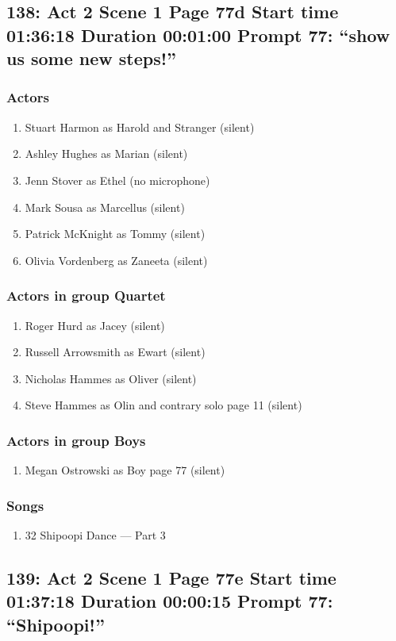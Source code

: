 \subsection{138: Act 2 Scene 1 Page 77d Start time 01:36:18 Duration 00:01:00 Prompt 77: ``show us some new steps!''}

\subsubsection{Actors}
\begin{enumerate}
\item Stuart Harmon as Harold and Stranger (silent)
\item Ashley Hughes as Marian (silent)
\item Jenn Stover as Ethel (no microphone)
\item Mark Sousa as Marcellus (silent)
\item Patrick McKnight as Tommy (silent)
\item Olivia Vordenberg as Zaneeta (silent)
\end{enumerate}
\subsubsection{Actors in group Quartet}
\begin{enumerate}
\item Roger Hurd as Jacey (silent)
\item Russell Arrowsmith as Ewart (silent)
\item Nicholas Hammes as Oliver (silent)
\item Steve Hammes as Olin and contrary solo page 11 (silent)
\end{enumerate}
\subsubsection{Actors in group Boys}
\begin{enumerate}
\item Megan Ostrowski as Boy page 77 (silent)
\end{enumerate}

\subsubsection{Songs}
\begin{enumerate}
\item 32 Shipoopi Dance --- Part 3
\end{enumerate}
\subsection{139: Act 2 Scene 1 Page 77e Start time 01:37:18 Duration 00:00:15 Prompt 77: ``Shipoopi!''}

